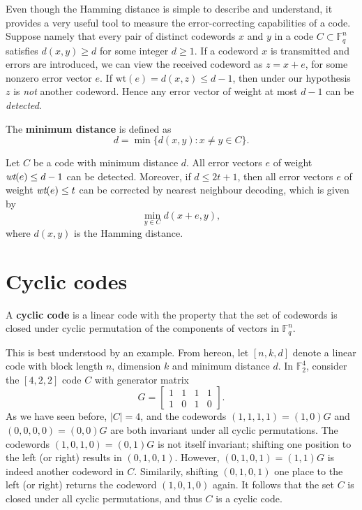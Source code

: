 \documentclass[english,bachelor]{liumaiex}
\begin{document}
Even though the Hamming distance is simple to describe and understand, it provides a very useful tool to measure the error-correcting capabilities of a code. Suppose namely that every pair of distinct codewords $x$ and $y$ in a code $C\subset\mathbb{F}_q^n$ satisfies $d(x,y)\geq d$ for some integer $d\geq1$. If a codeword $x$ is transmitted and errors are introduced, we can view the received codeword as $z=x+e$, for some nonzero error vector $e$. If $\textrm{wt}(e)=d(x,z)\leq d-1$, then under our hypothesis $z$ is \emph{not} another codeword. Hence any error vector of weight at most $d-1$ can be \emph{detected}.

\begin{define}
The \textbf{minimum distance} is defined as
\begin{displaymath}
d=\min\{d(x,y)\colon x\neq y\in C\}.
\end{displaymath}
\end{define}

\begin{prop}
Let $C$ be a code with minimum distance $d$. All error vectors $e$ of weight $\emph{wt}(e) \leq d-1$ can be detected. Moreover, if $d\leq 2t+1$, then all error vectors $e$ of weight $\emph{wt}(e) \leq t$ can be corrected by nearest neighbour decoding, which is given by $$\min_{y\in C}d(x+e,y),$$ where $d(x,y)$ is the Hamming distance. \emph{\cite[p.~462, Proposition~2.1]{uag}}
\end{prop}

\section{Cyclic codes}
\begin{define}
A \textbf{cyclic code} is a linear code with the property that the set of codewords is closed under cyclic permutation of the components of vectors in $\mathbb{F}_q^n$.
\end{define}
This is best understood by an example. From hereon, let $[n,k,d]$ denote a linear code with block length $n$, dimension $k$ and minimum distance $d$. In $\mathbb{F}_2^4$, consider the $[4,2,2]$ code $C$ with generator matrix
\begin{displaymath}
G=
\begin{bmatrix}
1 & 1 & 1 & 1\\
1 & 0 & 1 & 0
\end{bmatrix}.
\end{displaymath}
As we have seen before, $\left|C\right|=4$, and the codewords $(1,1,1,1)=(1,0)G$ and $(0,0,0,0)=(0,0)G$ are both invariant under all cyclic permutations. The codewords $(1,0,1,0)=(0,1)G$ is not itself invariant; shifting one position to the left (or right) results in $(0,1,0,1)$. However, $(0,1,0,1)=(1,1)G$ is indeed another codeword in $C$. Similarily, shifting $(0,1,0,1)$ one place to the left (or right) returns the codeword $(1,0,1,0)$ again. It follows that the set $C$ is closed under all cyclic permutations, and thus $C$ is a cyclic code.
\end{document}
